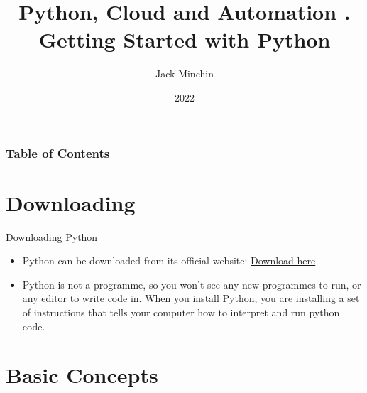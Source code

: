 \documentclass[aspectratio=169]{beamer}
\title{\large{\textbf{Python, Cloud and Automation}} \newline\newline 2. Getting Started with Python}
\author{Jack Minchin}
\institute{Tourism Economics}
\date{2022}
\begin{document}
\frame{\titlepage}

\begin{frame}
\frametitle{Table of Contents}
\tableofcontents
\end{frame}

\section{Downloading}
\begin{frame}{Downloading Python}

\begin{itemize}
	\item Python can be downloaded from its official website:
\href{https://www.python.org/downloads/release/python-3104/}{Download here}

\item Python is not a programme, so you won't see any new programmes to run, or any editor to write code in. When you install Python, you are installing a set of instructions that tells your computer how to interpret and run python code. 
\end{itemize}

	
\end{frame}



\section{Basic Concepts}
\end{document}
